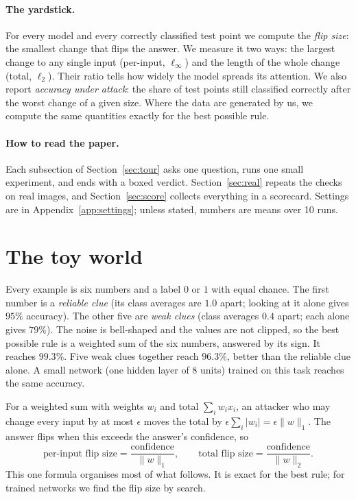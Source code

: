 \documentclass[11pt]{article}
\begin{document}
\paragraph{The yardstick.} For every model and every correctly classified test point we compute the \emph{flip size}: the smallest change that flips the answer. We measure it two ways: the largest change to any single input (per-input, $\ell_\infty$) and the length of the whole change (total, $\ell_2$). Their ratio tells how widely the model spreads its attention. We also report \emph{accuracy under attack}: the share of test points still classified correctly after the worst change of a given size. Where the data are generated by us, we compute the same quantities exactly for the best possible rule.

\paragraph{How to read the paper.} Each subsection of Section~\ref{sec:tour} asks one question, runs one small experiment, and ends with a boxed verdict. Section~\ref{sec:real} repeats the checks on real images, and Section~\ref{sec:score} collects everything in a scorecard. Settings are in Appendix~\ref{app:settings}; unless stated, numbers are means over 10 runs.

\section{The toy world}
\label{sec:world}

Every example is six numbers and a label $0$ or $1$ with equal chance. The first number is a \emph{reliable clue} (its class averages are $1.0$ apart; looking at it alone gives $95\%$ accuracy). The other five are \emph{weak clues} (class averages $0.4$ apart; each alone gives $79\%$). The noise is bell-shaped and the values are not clipped, so the best possible rule is a weighted sum of the six numbers, answered by its sign. It reaches $99.3\%$. Five weak clues together reach $96.3\%$, better than the reliable clue alone. A small network (one hidden layer of 8 units) trained on this task reaches the same accuracy.

For a weighted sum with weights $w_i$ and total $\sum_i w_i x_i$, an attacker who may change every input by at most $\epsilon$ moves the total by $\epsilon\sum_i |w_i|=\epsilon\|w\|_1$. The answer flips when this exceeds the answer's confidence, so
\[
\text{per-input flip size}=\frac{\text{confidence}}{\|w\|_1},\qquad
\text{total flip size}=\frac{\text{confidence}}{\|w\|_2}.
\]
This one formula organises most of what follows. It is exact for the best rule; for trained networks we find the flip size by search.
\end{document}
